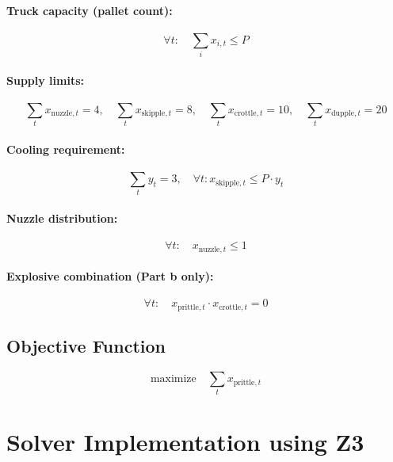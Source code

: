 \documentclass{article}
\begin{document}
\paragraph{Truck capacity (pallet count):}
\[
\forall t: \quad \sum_i x_{i,t} \leq P
\]

\paragraph{Supply limits:}
\[
\sum_t x_{\text{nuzzle},t} = 4, \quad
\sum_t x_{\text{skipple},t} = 8, \quad
\sum_t x_{\text{crottle},t} = 10, \quad
\sum_t x_{\text{dupple},t} = 20
\]

\paragraph{Cooling requirement:}
\[
\sum_t y_t = 3, \quad \forall t: x_{\text{skipple},t} \leq P \cdot y_t
\]

\paragraph{Nuzzle distribution:}
\[
\forall t: \quad x_{\text{nuzzle},t} \leq 1
\]

\paragraph{Explosive combination (Part b only):}
\[
\forall t: \quad x_{\text{prittle},t} \cdot x_{\text{crottle},t} = 0
\]

\subsection{Objective Function}
\[
\text{maximize} \quad \sum_t x_{\text{prittle},t}
\]

\section{Solver Implementation using Z3}
\end{document}
